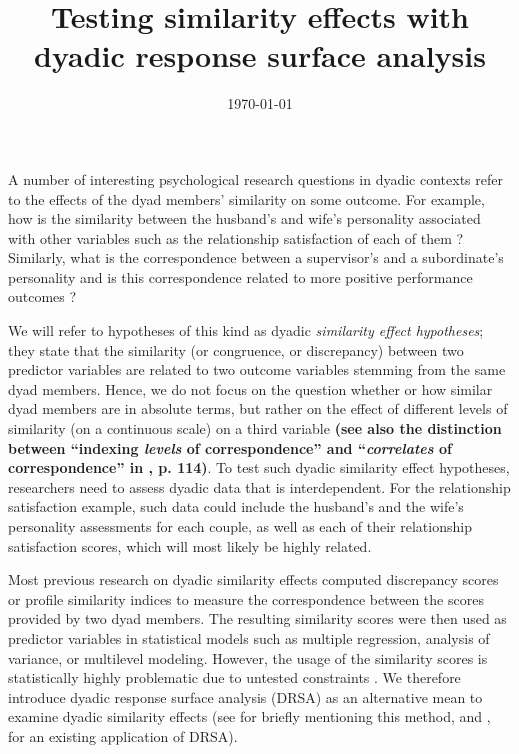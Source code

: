 \documentclass[jou,a4paper,draftfirst]{apa6}
\title{Testing similarity effects with dyadic response surface analysis}
\date{\today}
\newcommand{\added}[1]{\textcolor{colour_added}{\bf{#1}}}
\begin{document}
\maketitle	%
A number of interesting psychological research questions in dyadic contexts refer to the effects of the dyad members’ similarity on some outcome. For example, how is the similarity between the husband's and wife’s personality associated with other variables such as the relationship satisfaction of each of them \parencite[e.g.,][]{DyrenforthEtAl2010}? Similarly, what is the correspondence between a supervisor’s and a subordinate’s personality and is this correspondence related to more positive performance outcomes \parencite[e.g.,][]{Strauss2001}? 

We will refer to hypotheses of this kind as dyadic \textit{similarity effect hypotheses}; they state that the similarity (or congruence, or discrepancy) between two predictor variables are related to two outcome variables stemming from the same dyad members. Hence, we do not focus on the question whether or how similar dyad members are in absolute terms, but rather on the effect of different levels of similarity (on a continuous scale) on a third variable \added{(see also the distinction between ``indexing \textit{levels} of correspondence'' and ``\textit{correlates} of correspondence'' in \nptextcite{Rogers_Wood_Furr_2018}, p. 114)}. To test such dyadic similarity effect hypotheses, researchers need to assess dyadic data that is interdependent. For the relationship satisfaction example, such data could include the husband's and the wife's personality assessments for each couple, as well as each of their relationship satisfaction scores, which will most likely be highly related.

Most previous research on dyadic similarity effects computed discrepancy scores or profile similarity indices to measure the correspondence between the scores provided by two dyad members. The resulting similarity scores were then used as predictor variables in statistical models such as multiple regression, analysis of variance, or multilevel modeling. However, the usage of the similarity scores is statistically highly problematic due to untested constraints \parencite[e.g.,][]{Edwards2001}. We therefore introduce dyadic response surface analysis (DRSA) as an alternative mean to examine dyadic similarity effects (see  for briefly mentioning this method, and , for an existing application of DRSA).
\end{document}
